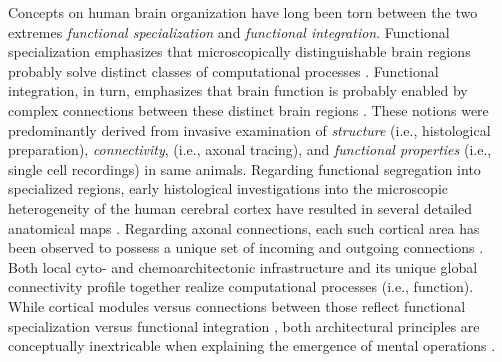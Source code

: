\documentclass{article} %
\begin{document}
Concepts on human brain organization have long been torn
between the two extremes
\textit{functional specialization} and \textit{functional integration}.
Functional specialization emphasizes that microscopically distinguishable
brain regions probably solve distinct classes of computational processes
\cite{kanwisher2010functional}.
Functional integration, in turn, emphasizes that brain function
is probably enabled by complex connections between these
distinct brain regions \cite{sporns14nn}.
%
These notions were predominantly derived from
invasive examination of \textit{structure} (i.e., histological preparation),
\textit{connectivity}, (i.e., axonal tracing),
and \textit{functional properties}
(i.e., single cell recordings) in same animals.
Regarding functional segregation into specialized regions,
early histological investigations into the microscopic heterogeneity of
the human cerebral cortex have resulted
in several detailed anatomical maps
\cite{brodmann1909vergleichende, vogt1919allgemeine}.
Regarding axonal connections,
each such cortical area has been observed
to possess a unique set of incoming and outgoing connections
\cite{passingham2002, young93monkey, scannell95cat}.
%
Both
local cyto- and chemoarchitectonic infrastructure
and its unique global connectivity profile
together realize computational processes (i.e., function).
While
cortical modules versus connections between those
reflect 
functional specialization versus functional integration
\cite{friston2002beyond, mesulam_sensation},
both architectural principles are conceptually inextricable when
explaining the emergence of mental operations
\cite{tononi1998complexity, saygin2012}.
\end{document}
